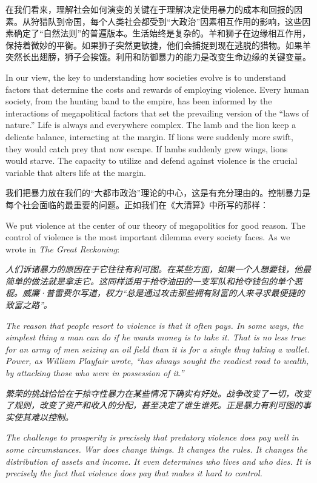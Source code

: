 \begin{paracol}{2}
\switchcolumn*
在我们看来，理解社会如何演变的关键在于理解决定使用暴力的成本和回报的因素。从狩猎队到帝国，每个人类社会都受到“大政治”因素相互作用的影响，这些因素确定了“自然法则”的普遍版本。生活始终是复杂的。羊和狮子在边缘相互作用，保持着微妙的平衡。如果狮子突然更敏捷，他们会捕捉到现在逃脱的猎物。如果羊突然长出翅膀，狮子会挨饿。利用和防御暴力的能力是改变生命边缘的关键变量。

\switchcolumn
In our view, the key to understanding how societies evolve is to understand factors that determine the costs and rewards of employing violence. Every human society, from the hunting band to the empire, has been informed by the interactions of megapolitical factors that set the prevailing version of the ``laws of nature.'' Life is always and everywhere complex. The lamb and the lion keep a delicate balance, interacting at the margin. If lions were suddenly more swift, they would catch prey that now escape. If lambs suddenly grew wings, lions would starve. The capacity to utilize and defend against violence is the crucial variable that alters life at the margin.

\switchcolumn*
我们把暴力放在我们的“大都市政治”理论的中心，这是有充分理由的。控制暴力是每个社会面临的最重要的问题。正如我们在《大清算》中所写的那样：

\switchcolumn
We put violence at the center of our theory of megapolitics for good reason. The control of violence is the most important dilemma every society faces. As we wrote in \emph{The Great Reckoning}:

\switchcolumn*
\emph{人们诉诸暴力的原因在于它往往有利可图。在某些方面，如果一个人想要钱，他最简单的做法就是拿走它。这同样适用于抢夺油田的一支军队和抢夺钱包的单个恶棍。威廉·普雷费尔写道，权力“总是通过攻击那些拥有财富的人来寻求最便捷的致富之路”。}

\switchcolumn
\emph{The reason that people resort to violence is that it often pays. In some ways, the simplest thing a man can do if he wants money is to take it. That is no less true for an army of men seizing an oil field than it is for a single thug taking a wallet. Power, as William Playfair wrote, ``has always sought the readiest road to wealth, by attacking those who were in possession of it.'' }

\switchcolumn*
\emph{繁荣的挑战恰恰在于掠夺性暴力在某些情况下确实有好处。战争改变了一切，改变了规则，改变了资产和收入的分配，甚至决定了谁生谁死。正是暴力有利可图的事实使其难以控制。}

\switchcolumn
\emph{The challenge to prosperity is precisely that predatory violence does pay well in some circumstances. War does change things. It changes the rules. It changes the distribution of assets and income. It even determines who lives and who dies. It is precisely the fact that violence does pay that makes it hard to control.}


\end{paracol}
